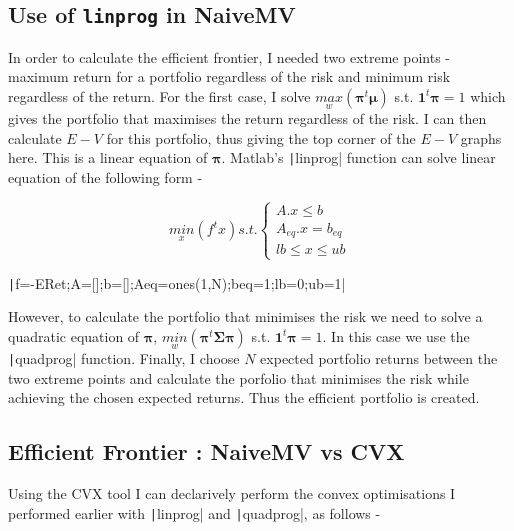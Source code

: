 \documentclass[11pt]{article}
\begin{document}
\subsection{Use of \texttt{linprog} in NaiveMV}

In order to calculate the efficient frontier, I needed two extreme points - maximum return for a 
portfolio regardless of the risk and minimum risk regardless of the return. For the first case,
I solve $\underset{w}{max}(\bm{\pi}^t\bm{\mu})$ s.t. $\bm{1}^t\bm{\pi} = 1$ which gives the portfolio that 
maximises the return regardless of the risk. I can then calculate $E-V$ for this portfolio, thus giving
the top corner of the $E-V$ graphs here. This is a linear equation of $\bm{\pi}$. Matlab's
\texttt|linprog| function can solve linear equation of the following form -

\begin{minipage}{.4\textwidth}
  	\[
		\underset{x}{min}(f^tx) s.t. 
	\begin{cases}
		A.x \leq b\\
		A_{eq}.x = b_{eq}\\
		lb \leq x \leq ub
	\end{cases}
	\]
\end{minipage}%
\begin{minipage}{.6\textwidth}
  	\texttt|f=-ERet;A=[];b=[];Aeq=ones(1,N);beq=1;lb=0;ub=1|
\end{minipage}

However, to calculate the portfolio that minimises the risk we need to solve a quadratic equation of 
$\bm{\pi}$, $\underset{w}{min}(\bm{\pi}^t\bm{\Sigma}\bm{\pi})$ s.t. $\bm{1}^t\bm{\pi} = 1$. In this case we use the
\texttt|quadprog| function. Finally, I choose $N$ expected portfolio returns between the two extreme
points and calculate the porfolio that minimises the risk while achieving the chosen expected returns.
Thus the efficient portfolio is created.

\subsection{Efficient Frontier : NaiveMV vs CVX}

Using the CVX tool I can declarively perform the convex optimisations I performed earlier with
\texttt|linprog| and \texttt|quadprog|, as follows -

\vspace{0.5cm}
\end{document}
